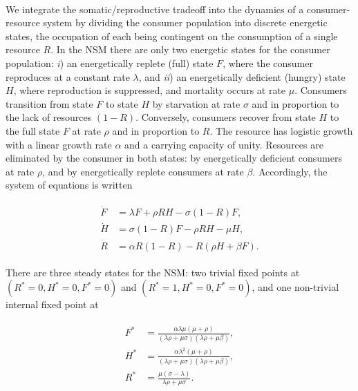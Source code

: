 \documentclass[12pt,english]{article}
\begin{document}
\begin{spacing}{1.9}
 \\ \nonumber
We integrate the somatic/reproductive tradeoff into the dynamics of a consumer-resource system by dividing the consumer population into discrete energetic states, the occupation of each being contingent on the consumption of a single resource $R$.
In the NSM there are only two energetic states for the consumer population: \emph{i}) an energetically replete (full) state $F$, where the consumer reproduces at a constant rate $\lambda$, and \emph{ii}) an energetically deficient (hungry) state $H$, where reproduction is suppressed, and mortality occurs at rate $\mu$.
Consumers transition from state $F$ to state $H$ by starvation at rate $\sigma$ and in proportion to the lack of resources $(1-R)$.
Conversely, consumers recover from state $H$ to the full state $F$ at rate $\rho$ and in proportion to $R$.
The resource has logistic growth with a linear growth rate $\alpha$ and a carrying capacity of unity.
Resources are eliminated by the consumer in both states: by energetically deficient consumers at rate $\rho$, and by energetically replete consumers at rate $\beta$.
Accordingly, the system of equations is written


\begin{align}
\begin{split}
\dot{F} &= \lambda F + \rho RH - \sigma (1-R)F,  \\
\dot{H} &= \sigma (1-R)F - \rho RH - \mu H,  \\
\dot{R} &= \alpha R(1-R) - R(\rho H+ \beta F).
\label{eq_specific}
\end{split}
\end{align}



There are three steady states for the NSM: two trivial fixed points at $(R^*=0,H^*=0,F^*=0)$ and $(R^*=1,H^*=0,F^*=0)$, and one non-trivial internal fixed point at

\begin{align}
\begin{split}
F^* &= \frac{\alpha  \lambda  \mu  (\mu +\rho )}{(\lambda  \rho +\mu  \sigma ) (\lambda  \rho +\mu  \beta)}, \\
H^* &= \frac{\alpha  \lambda ^2 (\mu +\rho )}{(\lambda  \rho +\mu  \sigma ) (\lambda  \rho +\mu  \beta)}, \\
R^* &= \frac{\mu  (\sigma -\lambda )}{\lambda  \rho +\mu  \sigma }.
\end{split}
\end{align}


\end{spacing}
\end{document}
